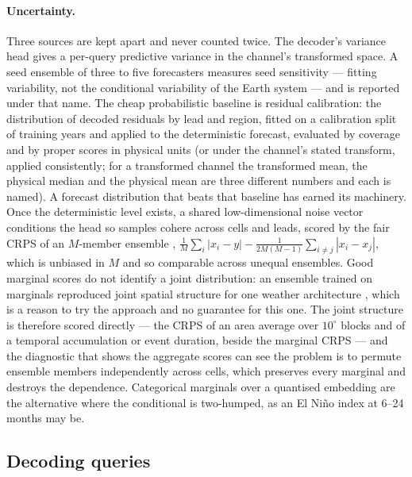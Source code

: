 \documentclass[10pt]{article}
\begin{document}
\paragraph{Uncertainty.} Three sources are kept apart and never counted
twice. The decoder's variance head gives a per-query predictive variance in
the channel's transformed space. A seed ensemble of three to five forecasters
measures seed sensitivity --- fitting variability, not the conditional
variability of the Earth system --- and is reported under that name. The
cheap probabilistic baseline is residual calibration: the distribution of
decoded residuals by lead and region, fitted on a calibration split of
training years and applied to the deterministic forecast, evaluated by
coverage and by proper scores in physical units (or under the channel's
stated transform, applied consistently; for a transformed channel the
transformed mean, the physical median and the physical mean are three
different numbers and each is named). A forecast distribution that beats
that baseline has earned its machinery. Once the deterministic level exists,
a shared low-dimensional noise vector conditions the head so samples cohere
across cells and leads, scored by the fair CRPS of an $M$-member ensemble
\cite{ferro2008,ferro2014,leutbecher},
$\frac1M\sum_i|x_i-y|-\frac{1}{2M(M-1)}\sum_{i\ne j}|x_i-x_j|$, which is
unbiased in $M$ and so comparable across unequal ensembles. Good marginal
scores do not identify a joint distribution: an ensemble trained on
marginals reproduced joint spatial structure for one weather architecture
\cite{fgn}, which is a reason to try the approach and no guarantee for this
one. The joint structure is therefore scored directly --- the CRPS of an
area average over $10^\circ$ blocks and of a temporal accumulation or event
duration, beside the marginal CRPS --- and the diagnostic that shows the
aggregate scores can see the problem is to permute ensemble members
independently across cells, which preserves every marginal and destroys the
dependence. Categorical marginals over a quantised embedding are the
alternative where the conditional is two-humped, as an El Ni\~no index at
6--24 months may be.

\subsection{Decoding queries}\label{sec:readout}
\end{document}
